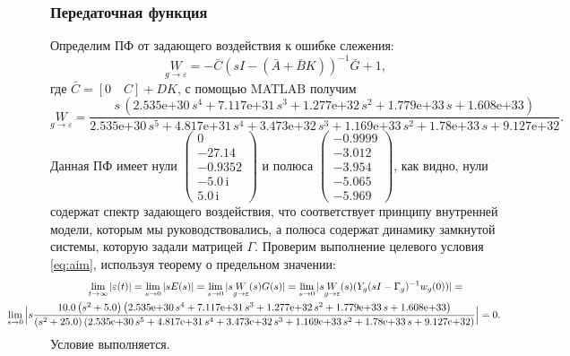 \subsubsection{Передаточная функция}

Определим ПФ от задающего воздействия к ошибке слежения:
\begin{equation*}
    \underset{g\rightarrow\varepsilon}{W}=-\bar C(sI-(\bar A+\bar BK))^{-1}\bar G+1,
\end{equation*}
где $\bar C=[0\quad C] + DK$, с помощью MATLAB получим
\begin{equation*}
    \underset{g\rightarrow\varepsilon}{W}=\frac{s\,{\left(\text{2.535e+30}\,s^4 +\text{7.117e+31}\,s^3 +\text{1.277e+32}\,s^2 +\text{1.779e+33}\,s+\text{1.608e+33}\right)}}{\text{2.535e+30}\,s^5 +\text{4.817e+31}\,s^4 +\text{3.473e+32}\,s^3 +\text{1.169e+33}\,s^2 +\text{1.78e+33}\,s+\text{9.127e+32}}.
\end{equation*}
Данная ПФ имеет нули $\left(\begin{array}{c}
0\\
-27.14\\
-0.9352\\
-5.0\,\mathrm{i}\\
5.0\,\mathrm{i}
\end{array}\right)$ и полюса $\left(\begin{array}{c}
-0.9999\\
-3.012\\
-3.954\\
-5.065\\
-5.969
\end{array}\right)$, как видно, нули содержат спектр задающего воздействия, что 
соответствует принципу внутренней модели, которым мы руководствовались, а полюса
содержат динамику замкнутой системы, которую задали матрицей $\Gamma$. 
Проверим выполнение целевого условия \eqref{eq:aim}, используя теорему о предельном
значении:
\begin{multline*}
    \lim_{t\rightarrow\infty}|\varepsilon(t)|=\lim_{s\rightarrow0}|sE(s)|=
    \lim_{s\rightarrow0}|s\underset{g\rightarrow\varepsilon}{W}(s)G(s)|=
    \lim_{s\rightarrow0}|s\underset{g\rightarrow\varepsilon}{W}(s)(Y_g(sI-\Gamma_g)^{-1}w_{g}(0))|=\\
    \hspace*{-1.5cm}\lim_{s\rightarrow0}\Big|s\frac{10.0\,{\left(s^2 +5.0\right)}\,{\left(\text{2.535e+30}\,s^4 +\text{7.117e+31}\,s^3 +\text{1.277e+32}\,s^2 +\text{1.779e+33}\,s+\text{1.608e+33}\right)}}{{\left(s^2 +25.0\right)}\,{\left(\text{2.535e+30}\,s^5 +\text{4.817e+31}\,s^4 +\text{3.473e+32}\,s^3 +\text{1.169e+33}\,s^2 +\text{1.78e+33}\,s+\text{9.127e+32}\right)}}\Big|=0.
\end{multline*}
Условие выполняется.


